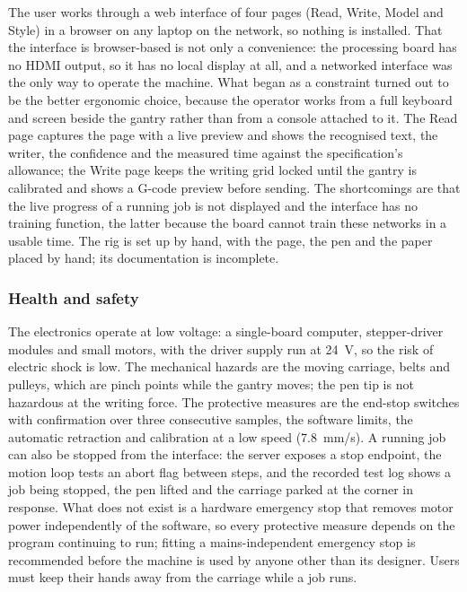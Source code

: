         The user works through a web interface of four pages (Read, Write, Model and Style) in a browser on any laptop on the network, so nothing is installed.
        That the interface is browser-based is not only a convenience: the processing board has no HDMI output, so it has no local display at all, and a networked interface was the only way to operate the machine.
        What began as a constraint turned out to be the better ergonomic choice, because the operator works from a full keyboard and screen beside the gantry rather than from a console attached to it.
        The Read page captures the page with a live preview and shows the recognised text, the writer, the confidence and the measured time against the specification's allowance; the Write page keeps the writing grid locked until the gantry is calibrated and shows a G-code preview before sending.
        The shortcomings are that the live progress of a running job is not displayed and the interface has no training function, the latter because the board cannot train these networks in a usable time.
        The rig is set up by hand, with the page, the pen and the paper placed by hand; its documentation is incomplete.

    \subsubsection{Health and safety}

        The electronics operate at low voltage: a single-board computer, stepper-driver modules and small motors, with the driver supply run at 24~V, so the risk of electric shock is low. 
        The mechanical hazards are the moving carriage, belts and pulleys, which are pinch points while the gantry moves; the pen tip is not hazardous at the writing force.
        The protective measures are the end-stop switches with confirmation over three consecutive samples, the software limits, the automatic retraction and calibration at a low speed (7.8~mm/s).
        A running job can also be stopped from the interface: the server exposes a stop endpoint, the motion loop tests an abort flag between steps, and the recorded test log shows a job being stopped, the pen lifted and the carriage parked at the corner in response.
        What does not exist is a hardware emergency stop that removes motor power independently of the software, so every protective measure depends on the program continuing to run; fitting a mains-independent emergency stop is recommended before the machine is used by anyone other than its designer.
        Users must keep their hands away from the carriage while a job runs.

